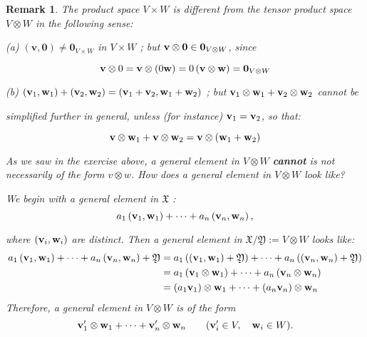 \documentclass[11pt]{article}
\newtheorem{remark}[theorem]{Remark}
\begin{document}
\begin{remark}
The product space \(V \times  W\) is different from the tensor product space \(V \otimes  W\) in the following sense:

(a) \(\left( {\mathbf{v},\mathbf{0}}\right)  \neq  {\mathbf{0}}_{V \times  W}\) in \(V \times  W\) ; but \(\mathbf{v} \otimes  {\bf 0} \in  {\bf 0}_{V \otimes  W}\), since

\[
{\bf v} \otimes  0 = {\bf v} \otimes  \left( {0\mathbf{w}}\right)
= 0\left( {\bf v} \otimes  {\bf w}\right) = {\bf 0}_{V \otimes  W}
\]


(b) \(\left( {{\bf v}_1,{\bf w}_1}\right)  + \left( {{\bf v}_2,{\bf w}_2}\right)  = \left( {{\bf v}_1 + {\bf v}_2,{\bf w}_1 + {\bf w}_2}\right)\) ; but \({\bf v}_1 \otimes  {\bf w}_1 + {\bf v}_2 \otimes  {\bf w}_2\) cannot be

simplified further in general, unless (for instance) \({\bf v}_1 = {\bf v}_2\), so that:

\[
\mathbf{v} \otimes  {\bf w}_1 + \mathbf{v} \otimes  {\bf w}_2 = \mathbf{v} \otimes  \left( {{\bf w}_1 + {\bf w}_2}\right)
\]

As we saw in the exercise above, a general element in $V \otimes W$ {\bf cannot} is not necessarily of the form $v \otimes w$.
How does a general element in $V \otimes W$ look like?

We begin with a general element in \(\mathfrak{X}\) :
\[
{a}_1\left( {{\bf v}_1,{\bf w}_1}\right)  + \cdots  + {a}_n\left( {{\bf v}_n,{\bf w}_n}\right) ,
\]

where \(\left( {{\bf v}_{i},{\bf w}_{i}}\right)\) are distinct. Then a general element in \(\mathfrak{X}/\mathfrak{Y} \mathrel{\text{ := }} V \otimes  W\) looks like:
\begin{align*}
{a}_1\left( {{\bf v}_1,{\bf w}_1}\right)  + \cdots  + {a}_n\left( {{\bf v}_n,{\bf w}_n}\right)  + \mathfrak{Y} &= {a}_1\left( {\left( {{\bf v}_1,{\bf w}_1}\right)  + \mathfrak{Y}}\right)  + \cdots  + {a}_n\left( {\left( {{\bf v}_n,{\bf w}_n}\right)  + \mathfrak{Y}}\right)
\\
&= {a}_1\left( {{\bf v}_1 \otimes  {\bf w}_1}\right)  + \cdots  + {a}_n\left( {{\bf v}_n \otimes  {\bf w}_n}\right)
\\
&= \left( {{a}_1{\bf v}_1}\right)  \otimes  {\bf w}_1 + \cdots  + \left( {{a}_n{\bf v}_n}\right)  \otimes  {\bf w}_n
\end{align*}
Therefore, a general element in \(V \otimes  W\) is of the form
\[
{\bf v}_1^{\prime } \otimes  {\bf w}_1 + \cdots  + {\bf v}_n^{\prime } \otimes  {\bf w}_n \quad \quad ({\bf v}_{i}^{\prime } \in  V, \quad {\bf w}_{i} \in  W).
\]
\end{remark}
\end{document}
